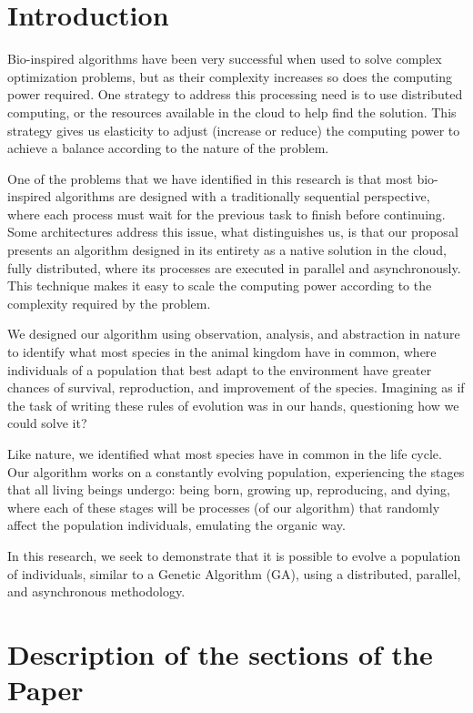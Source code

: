 \documentclass[runningheads]{llncs}
\begin{document}
\section{Introduction} 

Bio-inspired algorithms have been very successful when used to solve complex
optimization problems, but as their complexity increases so does the computing
power required. One strategy to address this processing need is to use
distributed computing, or the resources available in the cloud to help find the
solution. This strategy gives us elasticity to adjust (increase or reduce) the
computing power to achieve a balance according to the nature of the problem.

One of the problems that we have identified in this research is that most
bio-inspired algorithms are designed with a traditionally sequential
perspective, where each process must wait for the previous task to finish
before continuing. Some architectures address this issue, what distinguishes
us, is that our proposal presents an algorithm designed in its entirety as a
native solution in the cloud, fully distributed, where its processes are
executed in parallel and asynchronously. This technique makes it easy to scale
the computing power according to the complexity required by the problem.

We designed our algorithm using observation, analysis, and abstraction in
nature to identify what most species in the animal kingdom have in common,
where individuals of a population that best adapt to the environment have
greater chances of survival, reproduction, and improvement of the species.
Imagining as if the task of writing these rules of evolution was in our hands,
questioning how we could solve it?

Like nature, we identified what most species have in common in the life cycle.
Our algorithm works on a constantly evolving population, experiencing the
stages that all living beings undergo: being born, growing up, reproducing, and
dying, where each of these stages will be processes (of our algorithm) that
randomly affect the population individuals, emulating the organic way.

In this research, we seek to demonstrate that it is possible to evolve a
population of individuals, similar to a Genetic Algorithm (GA), using a
distributed, parallel, and asynchronous methodology.

\section{Description of the sections of the Paper} 
\end{document}
